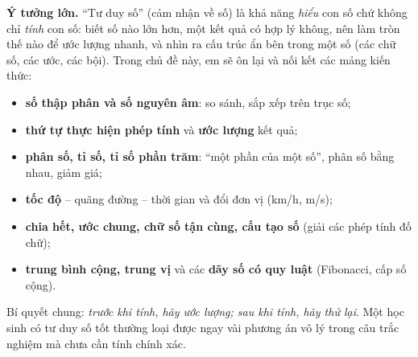 \documentclass[11pt]{article}
\begin{document}
\begin{knowbox}
\textbf{Ý tưởng lớn.} ``Tư duy số'' (cảm nhận về số) là khả năng \emph{hiểu} con số chứ không chỉ \emph{tính} con số:
biết số nào lớn hơn, một kết quả có hợp lý không, nên làm tròn thế nào để ước lượng nhanh, và nhìn ra cấu trúc ẩn
bên trong một số (các chữ số, các ước, các bội). Trong chủ đề này, em sẽ ôn lại và nối kết các mảng kiến thức:
\begin{itemize}[leftmargin=1.4em,itemsep=1pt,topsep=2pt]
  \item \textbf{số thập phân và số nguyên âm}: so sánh, sắp xếp trên trục số;
  \item \textbf{thứ tự thực hiện phép tính} và \textbf{ước lượng} kết quả;
  \item \textbf{phân số, tỉ số, tỉ số phần trăm}: ``một phần của một số'', phân số bằng nhau, giảm giá;
  \item \textbf{tốc độ} -- quãng đường -- thời gian và đổi đơn vị (km/h, m/s);
  \item \textbf{chia hết, ước chung, chữ số tận cùng, cấu tạo số} (giải các phép tính đố chữ);
  \item \textbf{trung bình cộng, trung vị} và các \textbf{dãy số có quy luật} (Fibonacci, cấp số cộng).
\end{itemize}
Bí quyết chung: \emph{trước khi tính, hãy ước lượng; sau khi tính, hãy thử lại}. Một học sinh có tư duy số tốt
thường loại được ngay vài phương án vô lý trong câu trắc nghiệm mà chưa cần tính chính xác.
\end{knowbox}
\vspace{0.3cm}
\end{document}
